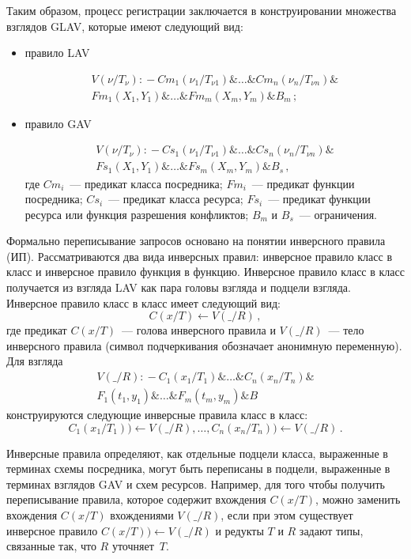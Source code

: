 \begin{multicols}{2}
     Таким образом, процесс регистрации заключается в конструировании множества
взглядов GLAV, которые имеют следующий вид:
\begin{itemize}
\item
правило LAV

\noindent
\begin{multline*}
\!\!\!{V(\nu /T_\nu ):} - Cm_1(\nu_1/T_{\nu 1})\&\ldots \& Cm_n(\nu_n/T_{\nu n}) \&\\
Fm_1(X_1,Y_1)\&\ldots \&Fm_m(X_m,Y_m)\& B_m\,;
\end{multline*}
\item правило GAV

\noindent
\begin{multline*}
\!\!\!{V(\nu / T_\nu ):} - Cs_1(\nu_1/T_{\nu 1})\&\ldots \&Cs_n(\nu_n/T_{\nu n}) \& \\
Fs_1(X_1,Y_1)\&\ldots\&Fs_m(X_m,Y_m)\& B_s\,,
\end{multline*}
где $Cm_i$~--- предикат класса посредника;
$Fm_i$~--- предикат функции посредника;
$Cs_i$~--- предикат класса ресурса;
$Fs_i$~--- предикат функции ресурса или функция
разрешения конфликтов; $B_m$ и $B_s$~--- ограничения.
\end{itemize}

     Формально переписывание запросов основано на понятии инверсного правила (ИП).
Рассматриваются два вида инверсных правил: инверсное правило класс в класс и
инверсное правило функция в функцию. Инверсное правило класс в класс получается из
взгляда LAV как пара головы взгляда и подцели взгляда. Инверсное правило класс в
класс имеет следующий вид:
$$
C(x/T)\leftarrow V(\_/R) \,,
$$
     где предикат $C(x/T)$~--- голова инверсного правила и $V(\_/R)$~--- тело инверсного
правила (символ подчеркивания обозначает анонимную переменную). Для взгляда
\begin{multline*}
{V(\_/R):}- C_1(x_1/T_1) \& \ldots \& C_n(x_n/T_n) \& \\
F_1(t_1, y_1) \& \ldots \&  F_m(t_m, y_m) \& B
\end{multline*}
     конструируются следующие инверсные правила класс в класс:
$$
C_1(x_1/ T_1) )\leftarrow  V(\_/R), \ldots , C_n(x_n / T_n) )\leftarrow V(\_/ R)\,.
$$

     Инверсные правила определяют, как отдельные подцели класса, выраженные в
терминах схемы посредника, могут быть переписаны в подцели, выраженные в терминах
взглядов GAV и схем ресурсов. Например, для того чтобы получить переписывание
правила, которое содержит вхождения $C(x/T)$, можно заменить вхождения $C(x/T)$
вхождениями $V(\_/R)$, если при этом существует инверсное правило $C(x/T) ) \leftarrow
V(\_/R)$ и редукты $T$ и $R$ задают типы, связанные так, что $R$ уточняет~$T$.


\end{multicols}
